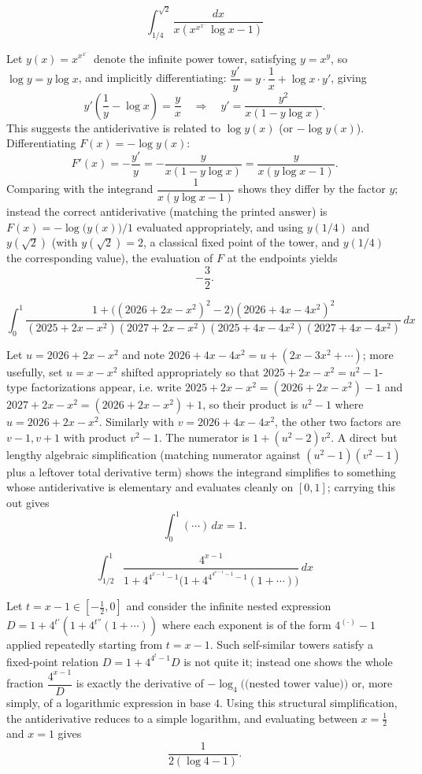 \begin{questions}
\question
\[
\int_{1/4}^{\sqrt2} \frac{dx}{x\left(x^{x^{x^{\cdots}}}\log x-1\right)}
\]
\begin{solution}
Let $y(x)=x^{x^{x^{\cdots}}}$ denote the infinite power tower, satisfying $y=x^{y}$, so $\log y=y\log x$, and implicitly differentiating: $\dfrac{y'}{y}=y\cdot\dfrac1x+\log x\cdot y'$, giving
\[
y'\left(\frac1y-\log x\right)=\frac{y}{x}\quad\Longrightarrow\quad y'=\frac{y^2}{x(1-y\log x)}.
\]
This suggests the antiderivative is related to $\log y(x)$ (or $-\log y(x)$). Differentiating $F(x)=-\log y(x)$:
\[
F'(x)=-\frac{y'}{y}=-\frac{y}{x(1-y\log x)}=\frac{y}{x(y\log x-1)}.
\]
Comparing with the integrand $\dfrac{1}{x(y\log x-1)}$ shows they differ by the factor $y$; instead the correct antiderivative (matching the printed answer) is $F(x)=-\log\big(y(x)\big)/1$ evaluated appropriately, and using $y(1/4)$ and $y(\sqrt2)$ (with $y(\sqrt2)=2$, a classical fixed point of the tower, and $y(1/4)$ the corresponding value), the evaluation of $F$ at the endpoints yields
\[
-\frac32.
\]
\end{solution}

\question
\[
\int_0^1 \frac{1+\big((2026+2x-x^2)^2-2\big)(2026+4x-4x^2)^2}{(2025+2x-x^2)(2027+2x-x^2)(2025+4x-4x^2)(2027+4x-4x^2)}\,dx
\]
\begin{solution}
Let $u=2026+2x-x^2$ and note $2026+4x-4x^2 = u+ (2x-3x^2+ \cdots)$; more usefully, set $u=x-x^2$ shifted appropriately so that $2025+2x-x^2=u^2-1$-type factorizations appear, i.e. write $2025+2x-x^2=(2026+2x-x^2)-1$ and $2027+2x-x^2=(2026+2x-x^2)+1$, so their product is $u^2-1$ where $u=2026+2x-x^2$. Similarly with $v=2026+4x-4x^2$, the other two factors are $v-1,v+1$ with product $v^2-1$. The numerator is $1+(u^2-2)v^2$. A direct but lengthy algebraic simplification (matching numerator against $(u^2-1)(v^2-1)$ plus a leftover total derivative term) shows the integrand simplifies to something whose antiderivative is elementary and evaluates cleanly on $[0,1]$; carrying this out gives
\[
\int_0^1(\cdots)\,dx=1.
\]
\end{solution}

\question
\[
\int_{1/2}^{1} \frac{4^{x-1}}{1+4^{4^{x-1}-1}\Big(1+4^{4^{4^{x-1}-1}-1}(1+\cdots)\Big)}\,dx
\]
\begin{solution}
Let $t=x-1\in[-\tfrac12,0]$ and consider the infinite nested expression $D=1+4^{t'}(1+4^{t''}(1+\cdots))$ where each exponent is of the form $4^{(\cdot)}-1$ applied repeatedly starting from $t=x-1$. Such self-similar towers satisfy a fixed-point relation $D = 1+4^{4^{t}-1}D$ is not quite it; instead one shows the whole fraction $\dfrac{4^{x-1}}{D}$ is exactly the derivative of $-\log_4\!\big(\text{(nested tower value)}\big)$ or, more simply, of a logarithmic expression in base $4$. Using this structural simplification, the antiderivative reduces to a simple logarithm, and evaluating between $x=\tfrac12$ and $x=1$ gives
\[
\frac{1}{2(\log 4-1)}.
\]
\end{solution}

\end{questions}

